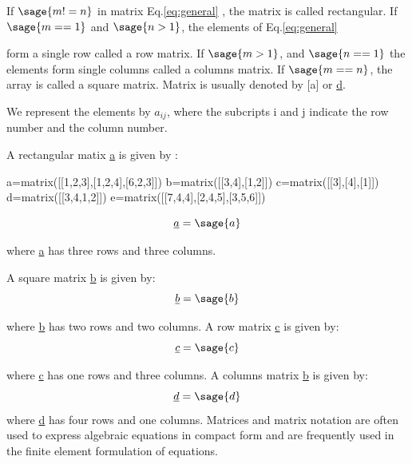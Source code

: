 \documentclass[12pt]{report}
\newcommand{\lab}[1]{
	Eq.\ref{#1}
}
\begin{document}
If $\sage{m!=n}$ in matrix \lab{eq:general},
the matrix is called rectangular. If $\sage{m==1}$ 
and $\sage{n>1}$, the elements of \lab{eq:general}
form a single row called a row matrix. If $\sage{m>1}$,
and $\sage{n==1}$ the elements form single columns called
a columns matrix. If $\sage{m==n}$, the array is called
a square matrix. Matrix is usually denoted by
[a] or \underline{d}.

We represent the elements by $a_{{ij}}$,
where the subcripts i and j indicate the
row number and the column number.

A rectangular matix \underline{a} is given by : 
\begin{sagesilent}
	a=matrix([[1,2,3],[1,2,4],[6,2,3]])
	b=matrix([[3,4],[1,2]])
	c=matrix([[3],[4],[1]])
	d=matrix([[3,4,1,2]])
	e=matrix([[7,4,4],[2,4,5],[3,5,6]])
\end{sagesilent}
\begin{equation}
	\underline{a}=\sage{a}
\label{eq:rectangle}
\end{equation}

where \underline{a} has three rows and three columns.

A square matrix \underline{b} is given by:
\begin{equation}
	\underline{b}=\sage{b}
\label{eq:square}
\end{equation}

where \underline{b} has two rows and two
columns. A row matrix \underline{c} is given by:
\begin{equation}
	\underline{c}=\sage{c}
\label{eq:row}
\end{equation}

where \underline{c} has one rows and three
columns. A columns matrix \underline{b} is given by:
\begin{equation}
	\underline{d}=\sage{d}
\label{eq:col}
\end{equation}
where \underline{d} has four rows and one 
columns. Matrices and matrix notation are
often used to express algebraic equations 
in compact form and are frequently used 
in the finite element formulation of equations.

\end{document}
